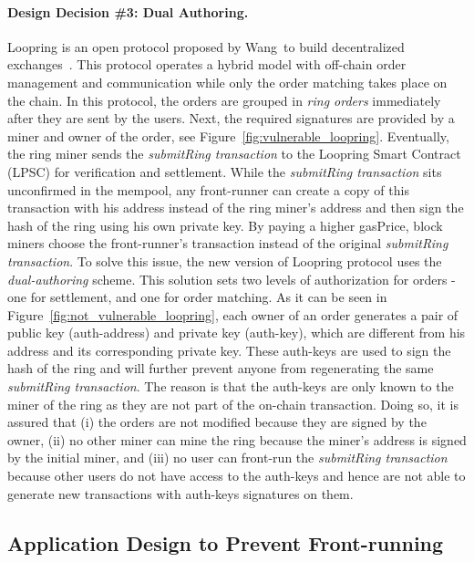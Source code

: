 \paragraph{Design Decision \#3: Dual Authoring.} Loopring is an open protocol proposed by Wang~\etal to build decentralized exchanges~\cite{wang2018loopring}. This protocol operates a hybrid model with off-chain order management and communication while only the order matching takes place on the chain. In this protocol, the orders are grouped in \emph{ring orders} immediately after they are sent by the users. Next, the required signatures are provided by a miner and owner of the order, see Figure~\ref{fig:vulnerable_loopring}. Eventually, the ring miner sends the \emph{submitRing transaction} to the Loopring Smart Contract (LPSC) for verification and settlement. While the \emph{submitRing transaction} sits unconfirmed in the mempool, any front-runner can create a copy of this transaction with his address instead of the ring miner's address and then sign the hash of the ring using his own private key. By paying a higher gasPrice, block miners choose the front-runner's transaction instead of the original \emph{submitRing transaction}. 
To solve this issue, the new version of Loopring protocol uses the \emph{dual-authoring} scheme. This solution sets two levels of authorization for orders - one for settlement, and one for order matching. As it can be seen in Figure~\ref{fig:not_vulnerable_loopring}, each owner of an order generates a pair of public key (auth-address) and private key (auth-key), which are different from his address and its corresponding private key. These auth-keys are used to sign the hash of the ring and will further prevent anyone from regenerating the same \emph{submitRing transaction}. The reason is that the auth-keys are only known to the miner of the ring as they are not part of the on-chain transaction. Doing so, it is assured that (i) the orders are not modified because they are signed by the owner, (ii) no other miner can mine the ring because the miner's address is signed by the initial miner, and (iii) no user can front-run the \emph{submitRing transaction} because other users do not have access to the auth-keys and hence are not able to generate new transactions with auth-keys signatures on them.


\subsection{Application Design to Prevent Front-running}

